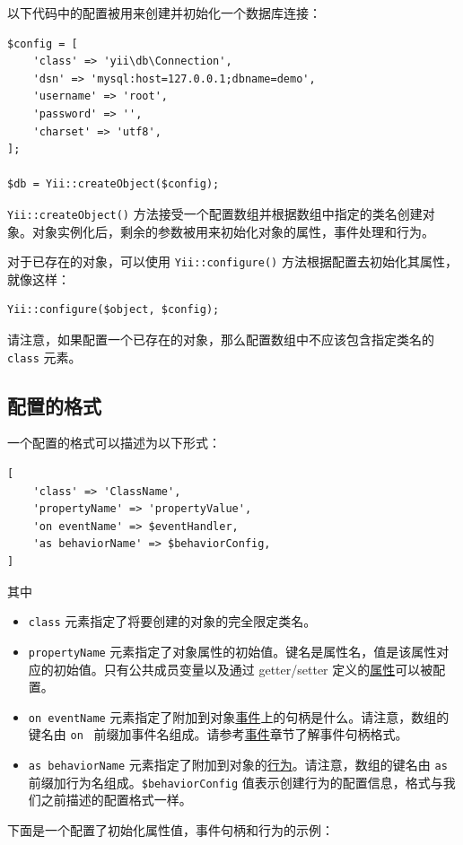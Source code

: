 以下代码中的配置被用来创建并初始化一个数据库连接：

\lstset{language=php}\begin{lstlisting}
$config = [
    'class' => 'yii\db\Connection',
    'dsn' => 'mysql:host=127.0.0.1;dbname=demo',
    'username' => 'root',
    'password' => '',
    'charset' => 'utf8',
];

$db = Yii::createObject($config);
\end{lstlisting}
\texttt{Yii\allowbreak{}::\allowbreak{}createObject()} 方法接受一个配置数组并根据数组中指定的类名创建对象。对象实例化后，剩余的参数被用来初始化对象的属性，事件处理和行为。

对于已存在的对象，可以使用 \texttt{Yii\allowbreak{}::\allowbreak{}configure()} 方法根据配置去初始化其属性，就像这样：

\lstset{language=php}\begin{lstlisting}
Yii::configure($object, $config);
\end{lstlisting}
请注意，如果配置一个已存在的对象，那么配置数组中不应该包含指定类名的 \lstinline|class| 元素。

\subsection{配置的格式 \label{concept-configurations.md::configuration-format}}
一个配置的格式可以描述为以下形式：

\lstset{language=php}\begin{lstlisting}
[
    'class' => 'ClassName',
    'propertyName' => 'propertyValue',
    'on eventName' => $eventHandler,
    'as behaviorName' => $behaviorConfig,
]
\end{lstlisting}
其中

\begin{itemize}
\item \lstinline|class| 元素指定了将要创建的对象的完全限定类名。
\item \lstinline|propertyName| 元素指定了对象属性的初始值。键名是属性名，值是该属性对应的初始值。只有公共成员变量以及通过 getter/setter 定义的\hyperref[concept-properties.md]{属性}可以被配置。
\item \lstinline|on eventName| 元素指定了附加到对象\hyperref[concept-events.md]{事件}上的句柄是什么。请注意，数组的键名由 \lstinline|on | 前缀加事件名组成。请参考\hyperref[concept-events.md]{事件}章节了解事件句柄格式。
\item \lstinline|as behaviorName| 元素指定了附加到对象的\hyperref[concept-behaviors.md]{行为}。请注意，数组的键名由 \lstinline|as | 前缀加行为名组成。\lstinline|$behaviorConfig| 
值表示创建行为的配置信息，格式与我们之前描述的配置格式一样。
\end{itemize}
下面是一个配置了初始化属性值，事件句柄和行为的示例：

